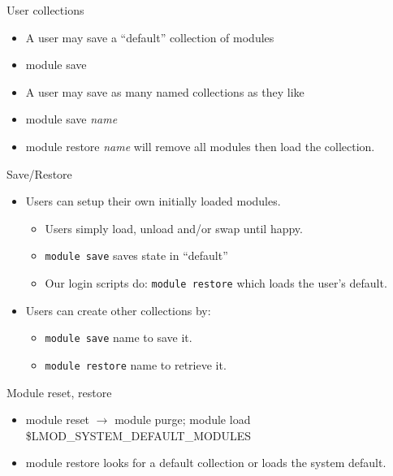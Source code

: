 \documentclass[dvipsnames,aspectratio=169]{beamer}
\begin{document}
\begin{frame}{User collections}
  \begin{itemize}
    \item A user may save a ``default'' collection of modules 
    \item module save 
    \item A user may save as many named collections as they like
    \item module save \emph{name}
    \item module restore \emph{name} will remove all modules then load
      the collection.
  \end{itemize}
\end{frame}

\begin{frame}{Save/Restore}
  \begin{itemize}
    \item Users can setup their own initially loaded modules.
      \begin{itemize}
        \item Users simply load, unload and/or swap until happy.
        \item {\color{blue}\texttt{module save}} saves state in ``default''
        \item Our login scripts do: {\color{blue}\texttt{module restore}}
          which loads the user's default.
      \end{itemize}
    \item Users can create other collections by:
      \begin{itemize}
        \item {\color{blue}\texttt{module save}
            {\color{violet}name}} to save it.
        \item {\color{blue}\texttt{module restore}
            {\color{violet}name}} to retrieve it.
      \end{itemize}
  \end{itemize}
\end{frame}

\begin{frame}{Module reset, restore}
  \begin{itemize}
    \item module reset $\rightarrow$ module purge; module load
      \$LMOD\_SYSTEM\_DEFAULT\_MODULES
    \item module restore looks for a default collection or loads the
      system default.
  \end{itemize}
\end{frame}
\end{document}
